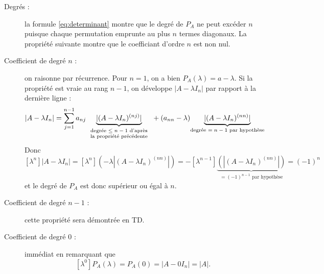 \proof
\begin{description}
  \item[Degrés :] la formule \eqref{eq:determinant} montre que le degré de $P_A$ ne peut excéder $n$ puisque chaque permutation emprunte au plus $n$ termes diagonaux. La propriété suivante montre que le coefficiant d'ordre $n$ est non nul.
  \item[Coefficient de degré $n$ :] on raisonne par récurrence. Pour $n = 1$, on a bien $P_A(\lambda) = a- \lambda$. Si la propriété est vraie au rang $n-1$, on développe $|A - \lambda I_n|$ par rapport à la dernière ligne : 
  $$
  |A - \lambda I_n| 
  = \sum_{j=1}^{n-1} a_{nj} \underset{\scriptsize
    \begin{tabular}{c}\text{degrée $\leq n-1$ d'après} \\
    \text{la propriété précédente}\end{tabular}
    }{\underbrace{|(A - \lambda I_n)^{(nj)}|}} + (a_{nn} - \lambda) \underset{\text{degrée $= n-1$ par hypothèse}}{\underbrace{|(A - \lambda I_n)^{(nn)}|}}
  $$
  Donc
  $$
  [\lambda^n]|A - \lambda I_n| 
  = [\lambda^n](-\lambda |(A - \lambda I_n)^{(nn)}|) 
  = - [\lambda^{n-1}]\underset{\text{$= (-1)^{n-1}$ par hypothèse}}{\underbrace{(|(A - \lambda I_n)^{(nn)}|)}}
  = (-1)^n
  $$
  et le degré de $P_A$ est donc supérieur ou égal à $n$.
  \item[Coefficient de degré $n-1$ :] cette propriété sera démontrée en TD.
  \item[Coefficient de degré $0$ :] immédiat en remarquant que
    $$
    [\lambda^0]P_A(\lambda) = P_A(0) = |A - 0 I_n| = |A|.
    $$
\end{description}
